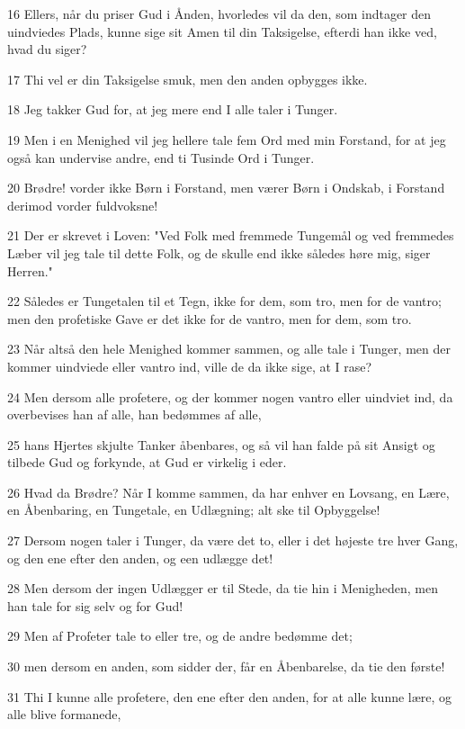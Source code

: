 \par 16 Ellers, når du priser Gud i Ånden, hvorledes vil da den, som indtager den uindviedes Plads, kunne sige sit Amen til din Taksigelse, efterdi han ikke ved, hvad du siger?
\par 17 Thi vel er din Taksigelse smuk, men den anden opbygges ikke.
\par 18 Jeg takker Gud for, at jeg mere end I alle taler i Tunger.
\par 19 Men i en Menighed vil jeg hellere tale fem Ord med min Forstand, for at jeg også kan undervise andre, end ti Tusinde Ord i Tunger.
\par 20 Brødre! vorder ikke Børn i Forstand, men værer Børn i Ondskab, i Forstand derimod vorder fuldvoksne!
\par 21 Der er skrevet i Loven: "Ved Folk med fremmede Tungemål og ved fremmedes Læber vil jeg tale til dette Folk, og de skulle end ikke således høre mig, siger Herren."
\par 22 Således er Tungetalen til et Tegn, ikke for dem, som tro, men for de vantro; men den profetiske Gave er det ikke for de vantro, men for dem, som tro.
\par 23 Når altså den hele Menighed kommer sammen, og alle tale i Tunger, men der kommer uindviede eller vantro ind, ville de da ikke sige, at I rase?
\par 24 Men dersom alle profetere, og der kommer nogen vantro eller uindviet ind, da overbevises han af alle, han bedømmes af alle,
\par 25 hans Hjertes skjulte Tanker åbenbares, og så vil han falde på sit Ansigt og tilbede Gud og forkynde, at Gud er virkelig i eder.
\par 26 Hvad da Brødre? Når I komme sammen, da har enhver en Lovsang, en Lære, en Åbenbaring, en Tungetale, en Udlægning; alt ske til Opbyggelse!
\par 27 Dersom nogen taler i Tunger, da være det to, eller i det højeste tre hver Gang, og den ene efter den anden, og een udlægge det!
\par 28 Men dersom der ingen Udlægger er til Stede, da tie hin i Menigheden, men han tale for sig selv og for Gud!
\par 29 Men af Profeter tale to eller tre, og de andre bedømme det;
\par 30 men dersom en anden, som sidder der, får en Åbenbarelse, da tie den første!
\par 31 Thi I kunne alle profetere, den ene efter den anden, for at alle kunne lære, og alle blive formanede,
